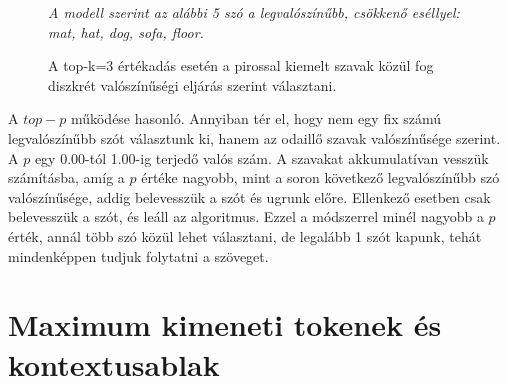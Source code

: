\documentclass[12pt]{report}
\begin{document}
    \begin{figure}[H]
        \centering

        \vspace{0.5em}
        \small\textit{A modell szerint az alábbi 5 szó a legvalószínűbb, csökkenő eséllyel: mat, hat, dog, sofa, floor.}


        \caption{A top-k=3 értékadás esetén a pirossal kiemelt szavak közül fog diszkrét valószínűségi eljárás szerint választani.}
    \end{figure}


    A $top-p$ működése hasonló.
    Annyiban tér el, hogy nem egy fix számú legvalószínűbb szót választunk ki, hanem az odaillő szavak valószínűsége szerint.
    A $p$ egy 0.00-tól 1.00-ig terjedő valós szám.
    A szavakat akkumulatívan vesszük számításba, amíg a $p$ értéke nagyobb, mint a soron következő legvalószínűbb szó valószínűsége, addig belevesszük a szót és ugrunk előre.
    Ellenkező esetben csak belevesszük a szót, és leáll az algoritmus.
    Ezzel a módszerrel minél nagyobb a $p$ érték, annál több szó közül lehet választani, de legalább 1 szót kapunk, tehát mindenképpen tudjuk folytatni a szöveget.


    \section{Maximum kimeneti tokenek és kontextusablak}
\end{document}
